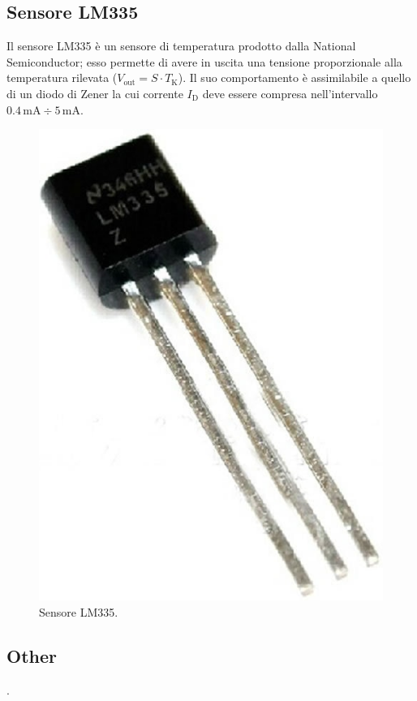 \documentclass[a4paper]{article}
\begin{document}
		\subsection{Sensore LM335}
			Il sensore LM335 è un sensore di temperatura prodotto dalla National Semiconductor; esso permette di avere in uscita una tensione proporzionale alla temperatura rilevata ($ V_{\mathrm{out}} = S \cdot T_{\mathrm{K}} $).
			\newline
			Il suo comportamento è assimilabile a quello di un diodo di Zener la cui corrente $ I_{\mathrm{D}} $ deve essere compresa nell'intervallo $ 0.4 \, \mathrm{mA} \div 5 \, \mathrm{mA} $.
			\begin{figure}[h!]
				\centering
				\includegraphics[scale=0.2]{LM335}
				\caption{Sensore LM335.}
				\label{fig:LM335}
			\end{figure}
		\subsection{Other}
			.
\end{document}
